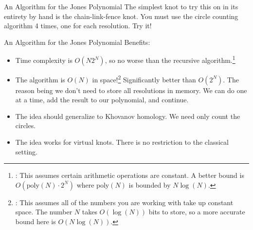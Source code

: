 \documentclass{beamer}
\begin{document}
    \begin{frame}{An Algorithm for the Jones Polynomial}
        The simplest knot to try this on in its entirety by hand is the
        chain-link-fence knot. You must use the circle counting algorithm
        4 times, one for each resolution. Try it!
    \end{frame}
    \begin{frame}{An Algorithm for the Jones Polynomial}
        Benefits:
        \begin{itemize}
            \item
                Time complexity is $O(N2^{N})$, so no worse than the
                recursive algorithm.\footnote{%
                    \textbf{\color{red}{Correction}}:
                    This assumes certain arithmetic operations are constant.
                    A better bound is $O(\textrm{poly}(N)\cdot{2}^{N})$ where
                    $\textrm{poly}(N)$ is bounded by $N\log(N)$.
                }
            \item
                The algorithm is $O(N)$ in space!\footnote{%
                    \textbf{\color{red}{Correction}}:
                    This assumes all of the numbers you are working with take
                    up constant space. The number $N$ takes $O(\log(N))$
                    bits to store, so a more accurate bound here is
                    $O(N\log(N))$.
                }
                Significantly better than
                $O(2^{N})$. The reason being we don't need to store all
                resolutions in memory. We can do one at a time, add the
                result to our polynomial, and continue.
            \item The idea should generalize to Khovanov homology. We need
                  only count the circles.
            \item The idea works for virtual knots. There is no restriction to
                  the classical setting.
        \end{itemize}
    \end{frame}
\end{document}
